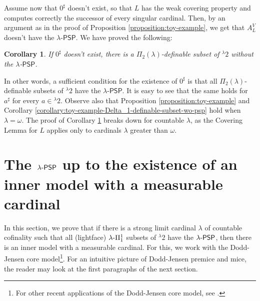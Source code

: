\documentclass{amsart}
\numberwithin{equation}{section}
\def\hyp{{\hbox{-}}}
\newtheorem{corollary}[theorem]{Corollary}
\theoremstyle{definition}
\theoremstyle{remark}
\newtheorem{remark}[theorem]{Remark}
\begin{document}
Assume now that $0^{\sharp}$ doesn't exist, so that $L$ has the weak covering property and computes correctly the successor of every singular cardinal. Then, by an argument as in the proof of Proposition \ref{proposition:toy-example}, we get that $A_{L}^{V}$ doesn't have the $\lambda$-$\mathsf{PSP}$. We have proved the following:

\begin{corollary}\label{corollary:toy-example-if-0-sharp-pi2-set-without-psp} If $0^{\sharp}$ doesn't exist, there is a $\Pi_2(\lambda)$-definable subset of ${}^{\lambda}2$ without the $\lambda$-$\mathsf{PSP}$. 
\end{corollary} 

In other words, a sufficient condition for the existence of $0^{\sharp}$ is that all $\Pi_2(\lambda)$-definable subsets of ${}^{\lambda}2$ have the $\lambda$-$\mathsf{PSP}$. It is easy to see that the same holds for $a^{\sharp}$ for every $a\in{}^{\lambda}2$. Observe also that Proposition \ref{proposition:toy-example} and Corollary \ref{corollary:toy-example-Delta_1-definable-subset-wo-psp} hold when $\lambda=\omega$. The proof of Corollary \ref{corollary:toy-example-if-0-sharp-pi2-set-without-psp} breaks down for countable $\lambda$, as the Covering Lemma for $L$ applies only to cardinals $\lambda$ greater than $\omega$. 



\section{The $\lambda\hyp\mathsf{PSP}$ up to the existence of an inner model with a measurable cardinal}\label{section:dodd-jensen}

In this section, we prove that if there is a strong limit cardinal $\lambda$ of countable cofinality such that all (lightface) $\lambda\hyp\Pi^1_1$ subsets of ${}^{\lambda}2$ have the $\lambda\hyp\mathsf{PSP}$, then there is an inner model with a measurable cardinal. For this, we work with the Dodd-Jensen core model\footnote{For other recent applications of the Dodd-Jensen core model, see \cite{ben2025definable}.}. For an intuitive picture of Dodd-Jensen premice and mice, the reader may look at the first paragraphs of the next section.
\end{document}
